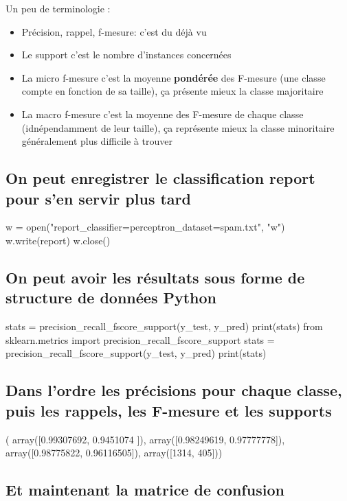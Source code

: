 Un peu de terminologie :

\begin{itemize}
  \item Précision, rappel, f-mesure: c'est du déjà vu
  \item Le support c'est le nombre d'instances concernées
  \item La micro f-mesure c'est la moyenne \textbf{pondérée} des F-mesure (une classe compte en fonction de sa taille), ça présente mieux la classe majoritaire
  \item La macro f-mesure c'est la moyenne des F-mesure de chaque classe (idnépendamment de leur taille), ça représente mieux la classe minoritaire généralement plus difficile à trouver
\end{itemize}

 \subsection*{ On peut enregistrer le classification report pour s'en servir plus tard}

\begin{python}
w = open("report_classifier=perceptron_dataset=spam.txt", "w")
w.write(report)
w.close()
\end{python}

 \subsection*{On peut avoir les résultats sous forme de structure de données Python}

\begin{python}
stats = precision_recall_fscore_support(y_test, y_pred)
print(stats)
from sklearn.metrics import precision_recall_fscore_support
stats = precision_recall_fscore_support(y_test, y_pred)
print(stats)
\end{python}

\subsection*{Dans l'ordre les précisions pour chaque classe, puis les rappels, les F-mesure et les supports}

\begin{python}
( array([0.99307692, 0.9451074 ]), 
  array([0.98249619, 0.97777778]), 
  array([0.98775822, 0.96116505]), 
  array([1314,  405]))
\end{python}

\subsection*{Et maintenant la matrice de confusion}

